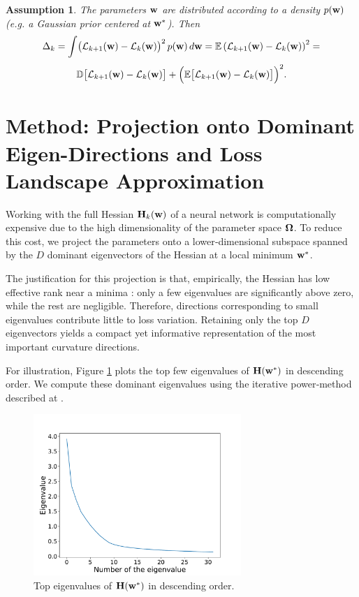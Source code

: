 \documentclass{article}
\newtheorem{assumption}{Assumption}
\begin{document}
\begin{assumption}
  The parameters $\mathbf{w}$ are distributed according to a density $p(\mathbf{w})$ (e.g. a Gaussian prior centered at $\mathbf{w}^*$). Then
  $$
    \Delta_k =
    \int \bigl(\mathcal{L}_{k+1}(\mathbf{w})-\mathcal{L}_k(\mathbf{w})\bigr)^2\, p(\mathbf{w})\, d\mathbf{w} =
    \mathbb{E} \left( \mathcal{L}_{k+1}(\mathbf{w}) - \mathcal{L}_{k}(\mathbf{w}) \right)^2 =
  $$
  $$
    \mathbb D \bigl[ \mathcal{L}_{k+1}(\mathbf{w}) - \mathcal{L}_k(\mathbf{w}) \bigr] +
    \Bigl( \mathbb E \bigl[ \mathcal{L}_{k+1}(\mathbf{w}) - \mathcal{L}_k(\mathbf{w}) \bigr] \Bigr)^2.
  $$
\end{assumption}


\section{Method: Projection onto Dominant Eigen-Directions and Loss Landscape Approximation}\label{sec:meth}

Working with the full Hessian $\mathbf{H}_k(\mathbf{w})$ of a neural network is computationally expensive due to the high dimensionality
of the parameter space $\boldsymbol{\Omega}$. To reduce this cost, we project the parameters onto a lower‑dimensional subspace spanned by the
$D$ dominant eigenvectors of the Hessian at a local minimum $\mathbf{w}^*$.

The justification for this projection is that, empirically, the Hessian has low effective rank near a minima \cite{sagun2018empirical}:
only a few eigenvalues are significantly above zero, while the rest are negligible. Therefore, directions corresponding to small
eigenvalues contribute little to loss variation. Retaining only the top $D$ eigenvectors yields a compact yet informative representation
of the most important curvature directions.

For illustration, Figure \ref{fig:evgen} plots the top few eigenvalues of $\mathbf{H}(\mathbf{w}^*)$ in descending order. We compute these dominant
eigenvalues using the iterative power‐method described at \cite{hessian-eigenthings}.

\begin{figure}[!htbp]
  \centering
  \includegraphics[width=0.7\textwidth]{img/eigenvalues.pdf}
  \caption{Top eigenvalues of $\mathbf{H}(\mathbf{w}^*)$ in descending order.}
  \label{fig:evgen}
\end{figure}
\end{document}
